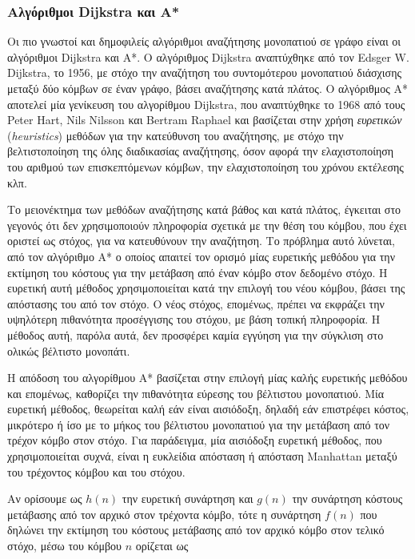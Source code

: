 \subsubsection{Αλγόριθμοι Dijkstra και A*}
Οι πιο γνωστοί και δημοφιλείς αλγόριθμοι αναζήτησης μονοπατιού σε γράφο είναι οι αλγόριθμοι Dijkstra και A*. Ο αλγόριθμος Dijkstra αναπτύχθηκε από τον Edsger W. Dijkstra, το 1956, με στόχο την αναζήτηση του συντομότερου μονοπατιού διάσχισης μεταξύ δύο κόμβων σε έναν γράφο, βάσει αναζήτησης κατά πλάτος. Ο αλγόριθμος Α* αποτελεί μία γενίκευση του αλγορίθμου Dijkstra, που αναπτύχθηκε το 1968 από τους Peter Hart, Nils Nilsson και Bertram Raphael και βασίζεται στην χρήση \textit{ευρετικών} (\textit{heuristics}) μεθόδων για την κατεύθυνση του αναζήτησης, με στόχο την βελτιστοποίηση της όλης διαδικασίας αναζήτησης, όσον αφορά την ελαχιστοποίηση του αριθμού των επισκεπτόμενων κόμβων, την ελαχιστοποίηση του χρόνου εκτέλεσης κλπ.

\bigskip
Το μειονέκτημα των μεθόδων αναζήτησης κατά βάθος και κατά πλάτος, έγκειται στο γεγονός ότι δεν χρησιμοποιούν πληροφορία σχετικά με την θέση του κόμβου, που έχει οριστεί ως στόχος, για να κατευθύνουν την αναζήτηση. Το πρόβλημα αυτό λύνεται, από τον αλγόριθμο A* ο οποίος απαιτεί τον ορισμό μίας ευρετικής μεθόδου για την εκτίμηση του κόστους για την μετάβαση από έναν κόμβο στον δεδομένο στόχο. Η ευρετική αυτή μέθοδος χρησιμοποιείται κατά την επιλογή του νέου κόμβου, βάσει της απόστασης του από τον στόχο. Ο νέος στόχος, επομένως, πρέπει να εκφράζει την υψηλότερη πιθανότητα προσέγγισης του στόχου, με βάση τοπική πληροφορία. Η μέθοδος αυτή, παρόλα αυτά, δεν προσφέρει καμία εγγύηση για την σύγκλιση στο ολικώς βέλτιστο μονοπάτι.

\bigskip
Η απόδοση του αλγορίθμου A* βασίζεται στην επιλογή μίας καλής ευρετικής μεθόδου και επομένως, καθορίζει την πιθανότητα εύρεσης του βέλτιστου μονοπατιού. Μία ευρετική μέθοδος, θεωρείται καλή εάν είναι αισιόδοξη, δηλαδή εάν επιστρέφει κόστος, μικρότερο ή ίσο με το μήκος του βέλτιστου μονοπατιού για την μετάβαση από τον τρέχον κόμβο στον στόχο. Για παράδειγμα, μία αισιόδοξη ευρετική μέθοδος, που χρησιμοποιείται συχνά, είναι η ευκλείδια απόσταση ή απόσταση Manhattan μεταξύ του τρέχοντος κόμβου και του στόχου.

\bigskip
Αν ορίσουμε ως $h(n)$ την ευρετική συνάρτηση και $g(n)$ την συνάρτηση κόστους μετάβασης από τον αρχικό στον τρέχοντα κόμβο, τότε η συνάρτηση $f(n)$ που δηλώνει την εκτίμηση του κόστους μετάβασης από τον αρχικό κόμβο στον τελικό στόχο, μέσω του κόμβου $n$ ορίζεται ως

